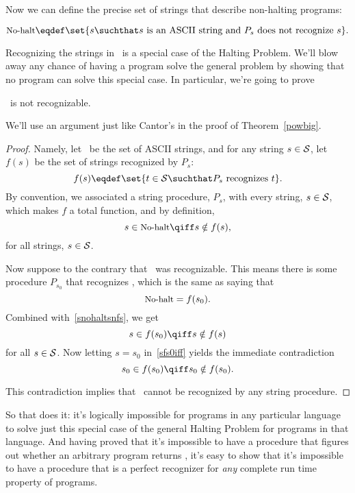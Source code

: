 Now we can define the precise set of strings that describe non-halting
programs:
\begin{definition}\label{nohalt_def}
\begin{equation}\label{nohalt_eqdef}
\nohalt \eqdef \set{s \suchthat s \text{ is an ASCII string and } P_s
  \text{ does not recognize } s}.
\end{equation}
\end{definition}
Recognizing the strings in \nohalt\ is a special case of the Halting
Problem.  We'll blow away any chance of having a program solve the
general problem by showing that no program can solve this special
case.  In particular, we're going to prove
\begin{theorem}\label{nohalt_thm}
\nohalt\ is not recognizable.
\end{theorem}

We'll use an argument just like Cantor's in the proof of
Theorem~\ref{powbig}.

\begin{proof}
Namely, let \asciistr\ be the set of ASCII strings, and for any string
$s \in \text{$\mathcal{S}$}$, let
$f(s)$ be the set of strings recognized by $P_s$:
\[
f(s) \eqdef \set{t \in \asciistr \suchthat P_s \text{ recognizes } t}.
\]
By convention, we associated a string procedure, $P_s$, with every
string, $s \in \text{$\mathcal{S}$}$, which makes $f$ a total function, and by
definition,
\begin{equation}\label{snohaltsnfs}
s \in \nohalt \qiff s \notin f(s),
\end{equation}
for all strings, $s \in \text{$\mathcal{S}$}$.

Now suppose to the contrary that \nohalt\ was recognizable.  This
means there is some procedure $P_{s_0}$ that recognizes \nohalt, which
is the same as saying that
\[
\text{\small{No-halt}} = f(s_0).
\]
Combined with~\eqref{snohaltsnfs}, we get
\begin{equation}\label{sfs0iff}
s \in f(s_0) \qiff s \notin f(s)
\end{equation}
for all $s \in \text{$\mathcal{S}$}$.  Now letting $s = s_0$ in~\eqref{sfs0iff}
yields the immediate contradiction
\[
s_0 \in f(s_0) \qiff s_0 \notin f(s_0).
\]

This contradiction implies that \nohalt\ cannot be recognized by any
string procedure.
\end{proof}

So that does it: it's logically impossible for programs in any
particular language to solve just this special case of the general
Halting Problem for programs in that language.  And having proved that
it's impossible to have a procedure that figures out whether an
arbitrary program returns \True, it's easy to show that
it's impossible to have a procedure that is a perfect recognizer for
\emph{any} complete run time property of programs.

